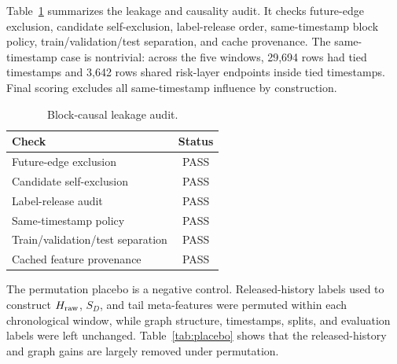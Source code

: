\documentclass[11pt]{article}
\theoremstyle{definition}
\theoremstyle{remark}
\begin{document}
Table~\ref{tab:audit} summarizes the leakage and causality audit. It checks future-edge exclusion, candidate self-exclusion, label-release order, same-timestamp block policy, train/validation/test separation, and cache provenance. The same-timestamp case is nontrivial: across the five windows, 29,694 rows had tied timestamps and 3,642 rows shared risk-layer endpoints inside tied timestamps. Final scoring excludes all same-timestamp influence by construction.

\begin{table}[h]
\centering
\caption{Block-causal leakage audit.}
\label{tab:audit}
\begin{tabular}{lc}
\toprule
Check & Status \\
\midrule
Future-edge exclusion & PASS \\
Candidate self-exclusion & PASS \\
Label-release audit & PASS \\
Same-timestamp policy & PASS \\
Train/validation/test separation & PASS \\
Cached feature provenance & PASS \\
\bottomrule
\end{tabular}
\end{table}

The permutation placebo is a negative control. Released-history labels used to construct $H_{\rm raw}$, $S_D$, and tail meta-features were permuted within each chronological window, while graph structure, timestamps, splits, and evaluation labels were left unchanged. Table~\ref{tab:placebo} shows that the released-history and graph gains are largely removed under permutation.

\begin{table}[h]
\centering
\caption{Permutation placebo. Real gains use true released-history labels; placebo gains permute released-history labels while keeping graph structure and evaluation labels fixed.}
\label{tab:placebo}
\end{table}
\end{document}
